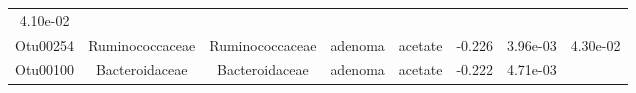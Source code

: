 \documentclass[11pt,]{article}
\begin{document}
\begin{longtable}[]{@{}cccccccc@{}}
\begin{minipage}[t]{0.08\columnwidth}
4.10e-02\strut
\end{minipage}\tabularnewline
\begin{minipage}[t]{0.08\columnwidth}\centering\strut
Otu00254\strut
\end{minipage} & \begin{minipage}[t]{0.15\columnwidth}\centering\strut
Ruminococcaceae\strut
\end{minipage} & \begin{minipage}[t]{0.15\columnwidth}\centering\strut
Ruminococcaceae\strut
\end{minipage} & \begin{minipage}[t]{0.08\columnwidth}\centering\strut
adenoma\strut
\end{minipage} & \begin{minipage}[t]{0.09\columnwidth}\centering\strut
acetate\strut
\end{minipage} & \begin{minipage}[t]{0.07\columnwidth}\centering\strut
-0.226\strut
\end{minipage} & \begin{minipage}[t]{0.08\columnwidth}\centering\strut
3.96e-03\strut
\end{minipage} & \begin{minipage}[t]{0.08\columnwidth}\centering\strut
4.30e-02\strut
\end{minipage}\tabularnewline
\begin{minipage}[t]{0.08\columnwidth}\centering\strut
Otu00100\strut
\end{minipage} & \begin{minipage}[t]{0.15\columnwidth}\centering\strut
Bacteroidaceae\strut
\end{minipage} & \begin{minipage}[t]{0.15\columnwidth}\centering\strut
Bacteroidaceae\strut
\end{minipage} & \begin{minipage}[t]{0.08\columnwidth}\centering\strut
adenoma\strut
\end{minipage} & \begin{minipage}[t]{0.09\columnwidth}\centering\strut
acetate\strut
\end{minipage} & \begin{minipage}[t]{0.07\columnwidth}\centering\strut
-0.222\strut
\end{minipage} & \begin{minipage}[t]{0.08\columnwidth}\centering\strut
4.71e-03\strut
\end{minipage} & \begin{minipage}[t]{0.08\columnwidth}\centering\strut

\end{minipage}
\end{longtable}
\end{document}
